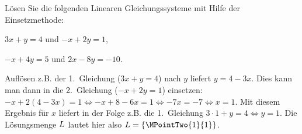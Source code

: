 \begin{MExercises}
\begin{MExercise}
Lösen Sie die folgenden Linearen Gleichungssysteme mit Hilfe der Einsetzmethode:
\begin{MExerciseItems}
\item{$3 x + y = 4$ und $- x + 2 y = 1$,}
\item{$- x + 4 y = 5$ und $2 x - 8 y = - 10$.}
\end{MExerciseItems}

\begin{MHint}{\iSolution}
\begin{MExerciseItems}
\item{Auflösen z.B. der 1.~Gleichung ($3 x + y = 4$) nach $y$ liefert $y = 4 - 3 x$. Dies kann man dann in die 2.~Gleichung
($- x + 2 y = 1$) einsetzen: $- x + 2 (4 - 3 x) = 1 \Leftrightarrow - x + 8 - 6 x = 1 \Leftrightarrow - 7 x = - 7
\Leftrightarrow x = 1$. Mit diesem Ergebnis für $x$ liefert in der Folge z.B. die 1.~Gleichung $3 \cdot 1 + y = 4
\Leftrightarrow y = 1$. Die Lösungsmenge $L$ lautet hier also ${\ML} = \{ \MPointTwo{1}{1} \}$.

}
\end{MExerciseItems}
\end{MHint}
\end{MExercise}
\end{MExercises}
